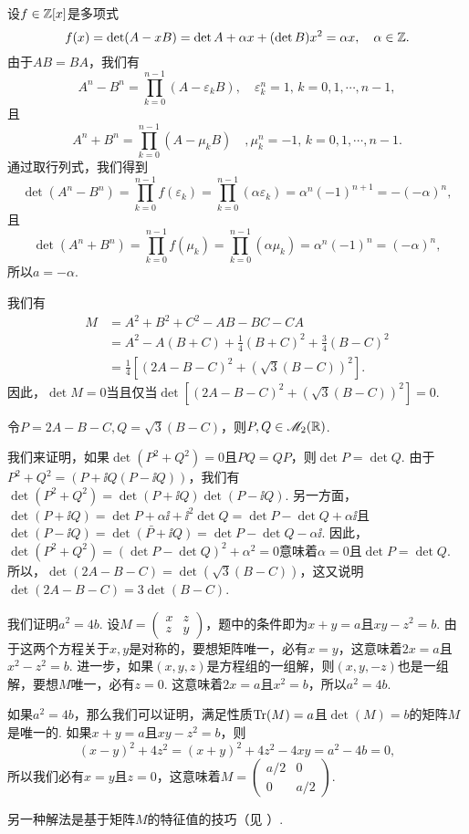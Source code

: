 \begin{solution}
  设$f\in\mathbb Z[x]$是多项式
  \[
    f(x) = \det(A-xB) = \det A + \alpha x + (\det B)x^2 = \alpha x,\quad \alpha \in\mathbb Z.
  \]
  由于$AB=BA$，我们有
  \[
    A^n - B^n = \prod_{k=0}^{n-1} (A-\varepsilon_kB),
    \quad \varepsilon_k^n=1,\,k=0,1,\cdots,n-1,
  \]
  且
  \[
    A^n + B^n = \prod_{k=0}^{n-1}(A-\mu_kB)\quad, \mu_k^n=-1,\,k=0,1,\cdots,n-1.
  \]
  通过取行列式，我们得到
  \[
    \det(A^n-B^n) = \prod_{k=0}^{n-1}f(\varepsilon_k) = \prod_{k=0}^{n-1}(\alpha\varepsilon_k) = \alpha^n(-1)^{n+1} = -(-\alpha)^n,
  \]
  且
  \[
    \det (A^n+B^n) = \prod_{k=0}^{n-1} f(\mu_k)
    = \prod_{k=0}^{n-1}(\alpha\mu_k) = \alpha^n(-1)^n = (-\alpha)^n,
  \]
  所以$a=-\alpha$.
\end{solution}

\begin{solution}
  我们有
  \begin{align*}
    M & = A^2 + B^2 + C^2 - AB - BC - CA \\
      & = A^2 - A(B+C) + \frac14(B+C)^2 + \frac34(B-C)^2 \\
      & = \frac14\left[ (2A-B-C)^2 + \left(\sqrt3(B-C)\right)^2 \right].
  \end{align*}
  因此，$\det M=0$当且仅当$\det\left[ (2A-B-C)^2 + \left(\sqrt3(B-C)\right)^2 \right]=0$.

  令$P=2A-B-C,Q=\sqrt3(B-C)$，则$P,Q\in\mathscr M_2(\mathbb R)$.

  我们来证明，如果$\det(P^2+Q^2)=0$且$PQ=QP$，则$\det P=\det Q$. 由于$P^2+Q^2=(P+\ii Q(P-\ii Q))$，我们有$\det(P^2+Q^2)=\det(P+\ii Q)\det(P-\ii Q)$. 另一方面，$\det(P+\ii Q)=\det P+\alpha\ii+\ii^2\det Q=\det P-\det Q+\alpha\ii$且$\det(P-\ii Q)=\bar{\det(P+\ii Q)}
  =\det P-\det Q-\alpha\ii$. 因此，$\det(P^2+Q^2)=(\det P-\det Q)^2+\alpha^2=0$意味着$\alpha=0$且$\det P=\det Q$. 所以，$\det(2A-B-C)=\det\left(\sqrt3(B-C)\right)$，这又说明$\det(2A-B-C)=3\det(B-C)$.
\end{solution}

\begin{solution}
  我们证明$a^2=4b$. 设$M=\begin{pmatrix}
    x & z \\
    z & y
  \end{pmatrix}$，题中的条件即为$x+y=a$且$xy-z^2=b$. 由于这两个方程关于$x,y$是对称的，要想矩阵唯一，必有$x=y$，这意味着$2x=a$且$x^2-z^2=b$. 进一步，如果$(x,y,z)$是方程组的一组解，则$(x,y,-z)$也是一组解，要想$M$唯一，必有$z=0$. 这意味着$2x=a$且$x^2=b$，所以$a^2=4b$.

  如果$a^2=4b$，那么我们可以证明，满足性质$\operatorname{Tr}(M)=a$且$\det(M)=b$的矩阵$M$是唯一的. 如果$x+y=a$且$xy-z^2=b$，则
  \[
    (x-y)^2 + 4z^2 = (x+y)^2 + 4z^2 - 4xy = a^2 - 4b =0,
  \]
  所以我们必有$x=y$且$z=0$，这意味着$M=\begin{pmatrix}
    a/2 & 0 \\
    0 & a/2
  \end{pmatrix}$.

  另一种解法是基于矩阵$M$的特征值的技巧（见 \cite{60}）.
\end{solution}

